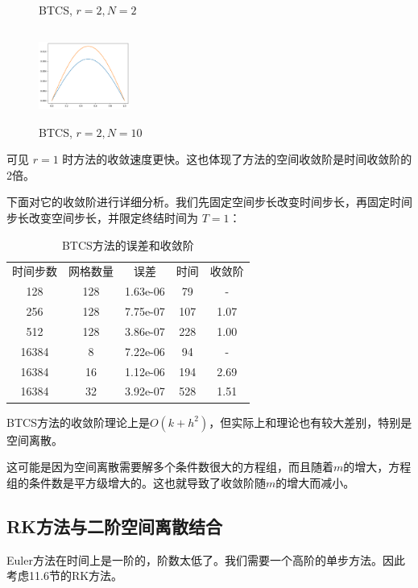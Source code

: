 \documentclass{ctexart}
\begin{document}
\begin{figure}[htbp]
\begin{minipage}{5cm}
		\caption{BTCS, $r=2,N=2$}
		\label{btcs5}
	\end{minipage}
	\begin{minipage}{5cm}
		\centering
		\includegraphics[width = 3cm, height = 3cm]{2-1-3.png}
		\caption{BTCS, $r=2,N=10$}
		\label{btcs6}
	\end{minipage}
\end{figure}

可见 $r=1$ 时方法的收敛速度更快。这也体现了方法的空间收敛阶是时间收敛阶的2倍。

下面对它的收敛阶进行详细分析。我们先固定空间步长改变时间步长，再固定时间步长改变空间步长，并限定终结时间为 $T=1$：

\begin{table}\centering
	\begin{tabular}{|c|c|c|c|c|}
	\hline
	时间步数 & 网格数量 & 误差 & 时间 & 收敛阶\\ \cline{1-5}
	128 & 128 & 1.63e-06 & 79  & - \\ \cline{1-5}
	256 & 128 & 7.75e-07 & 107 & 1.07 \\ \cline{1-5}
	512 & 128 & 3.86e-07 & 228 & 1.00\\ \cline{1-5}
	16384 & 8 & 7.22e-06 & 94 & - \\ \cline{1-5}
	16384 & 16 & 1.12e-06 & 194 & 2.69 \\ \cline{1-5}
	16384 & 32 & 3.92e-07 & 528 & 1.51 \\ \cline{1-5}
	\end{tabular}
	\caption{BTCS方法的误差和收敛阶}
\end{table}

BTCS方法的收敛阶理论上是$O(k+h^2)$，但实际上和理论也有较大差别，特别是空间离散。

这可能是因为空间离散需要解多个条件数很大的方程组，而且随着$m$的增大，方程组的条件数是平方级增大的。这也就导致了收敛阶随$m$的增大而减小。

\subsection{RK方法与二阶空间离散结合}

Euler方法在时间上是一阶的，阶数太低了。我们需要一个高阶的单步方法。因此考虑11.6节的RK方法。
\end{document}
